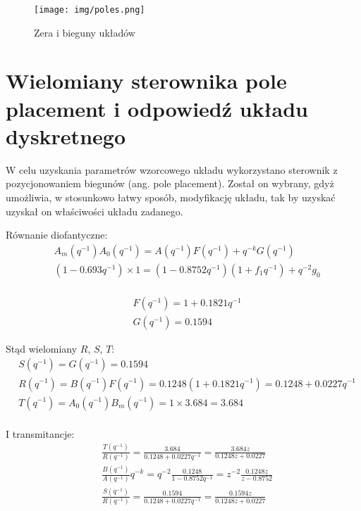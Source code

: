 \documentclass[fleqn]{article}
\newcommand \A {1 - 0.8752 q^{-1}}
\newcommand \B {0.1248}
\newcommand \Am {1 - 0.693 q^{-1}}
\newcommand \Bm {3.684}
\newcommand \aOne {-0.8752}
\newcommand \amOne {-0.693}
\newcommand \G {0.1594}
\newcommand \F {1 + 0.1821 q^{-1}}
\newcommand \R {\B + 0.0227 q^{-1}}
\newcommand \T {\Bm}
\begin{document}
\begin{figure}[H]
    \centering
    \texttt{[image: img/poles.png]}
    \caption{Zera i bieguny układów}
    \label{fig:Poles}
\end{figure}


\section{Wielomiany sterownika pole placement i odpowiedź układu dyskretnego}

W celu uzyskania parametrów wzorcowego układu wykorzystano sterownik z pozycjonowaniem biegunów (ang. pole placement). Został on wybrany, gdyż umożliwia, w stosunkowo łatwy sposób, modyfikację układu, tak by uzyskać uzyskał on właściwości układu zadanego.   

Równanie diofantyczne: 
\begin{equation}\label{eq:dioph}
\begin{split}
& A_m(q^{-1}) A_0(q^{-1}) = A(q^{-1}) F(q^{-1}) + q^{-k} G(q^{-1}) \\
& (\Am) \times 1 = (\A) (1 + f_1 q^{-1}) + q^{-2} g_0 \\
\end{split}
\end{equation}

\begin{equation}\label{eq:dioph_sol}
\begin{split}
& F(q^{-1}) = \F \\
& G(q^{-1}) = \G
\end{split}
\end{equation}

Stąd wielomiany $R$, $S$, $T$:
\begin{equation}\label{eq:polynomials}
\begin{split}
& S(q^{-1}) = G(q^{-1}) = \G \\
& R(q^{-1}) = B(q^{-1})F(q^{-1}) = \B (\F) = \R \\
& T(q^{-1}) = A_0(q^{-1})B_m(q^{-1}) = 1 \times \Bm = \Bm \\
\end{split}
\end{equation}

I transmitancje:
\begin{equation}\label{eq:transmitances}
\begin{split}
& \frac{T(q^{-1})}{R(q^{-1})} = \frac{\T}{\R} = \frac{3.684 z}{0.1248z + 0.0227}\\
& \frac{B(q^{-1})}{A(q^{-1})} q^{-k} = q^{-2}\frac{\B}{\A} = z^{-2} \frac{0.1248 z}{z - 0.8752}\\
& \frac{S(q^{-1})}{R(q^{-1})} = \frac{\G}{\R} = \frac{0.1594 z}{0.1248z + 0.0227}\\
\end{split}
\end{equation}
\end{document}

